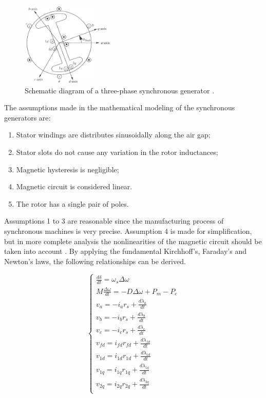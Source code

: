\begin{figure}[!ht]
    \centering
    \includegraphics[width = 0.4\textwidth]{images/sg-schematic.png}
    \caption{Schematic diagram of a three-phase synchronous generator \cite{sauer2017power}.}
    \label{fig:sg-schematic}
\end{figure}

\newpage
The assumptions made in the mathematical modeling of the synchronous generators are:
\begin{enumerate}
    \item Stator windings are distributes sinusoidally along the air gap;
    \item Stator slots do not cause any variation in the rotor inductances;
    \item Magnetic hysteresis is negligible;
    \item Magnetic circuit is considered linear.
    \item The rotor has a single pair of poles.
\end{enumerate}

Assumptions 1 to 3 are reasonable since the manufacturing process of synchronous
machines is very precise. Assumption 4 is made for simplification, but in more
complete analysis the nonlinearities of the magnetic circuit should be taken
into account \cite{kundur2022power}. By applying the fundamental Kirchhoff's,
Faraday's and Newton's laws, the following relationships can be derived.

\begin{equation}
    \begin{cases}
        \frac{d\delta}{dt} = \omega_s \Delta\omega\\
        M\frac{\Delta\omega}{dt} = -D\Delta\omega + P_m - P_e\\
        v_a = -i_a r_s + \frac{d\lambda_a}{dt}\\
        v_b = -i_b r_s + \frac{d\lambda_b}{dt}\\
        v_c = -i_c r_s + \frac{d\lambda_c}{dt}\\
        v_{fd} = i_{fd}r_{fd} + \frac{d\lambda_{fd}}{dt}\\
        v_{1d} = i_{1d}r_{1d} + \frac{d\lambda_{1d}}{dt}\\
        v_{1q} = i_{1q}r_{1q} + \frac{d\lambda_{1q}}{dt}\\
        v_{2q} = i_{2q}r_{2q} + \frac{d\lambda_{2q}}{dt}\\
    \end{cases}
    \label{eq:gen_eqs_abc}
\end{equation}

